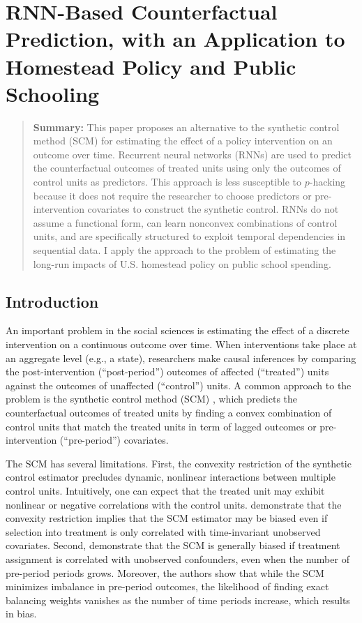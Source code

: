 \chapter[RNN-Based Counterfactual Prediction, with an Application to Homestead Policy and Public Schooling]{RNN-Based Counterfactual Prediction, with an Application to Homestead Policy and Public Schooling}\label{rnns-causal}

\begin{quote}  
	\textbf{Summary:} This paper proposes an alternative to the synthetic control method (SCM) for estimating the effect of a policy intervention on an outcome over time. Recurrent neural networks (RNNs) are used to predict the counterfactual outcomes of treated units using only the outcomes of control units as predictors. This approach is less susceptible to $p$-hacking because it does not require the researcher to choose predictors or pre-intervention covariates to construct the synthetic control. RNNs do not assume a functional form, can learn nonconvex combinations of control units, and are specifically structured to exploit temporal dependencies in sequential data. I apply the approach to the problem of estimating the long-run impacts of U.S. homestead policy on public school spending.
\end{quote}

\section{Introduction} 
\noindent

An important problem in the social sciences is estimating the effect of a discrete intervention on a continuous outcome over time. When interventions take place at an aggregate level (e.g., a state), researchers make causal inferences by comparing the post-intervention (``post-period'') outcomes of affected (``treated'') units against the outcomes of unaffected  (``control'') units. A common approach to the problem is the synthetic control method (SCM) \citep{abadie2010synthetic}, which predicts the counterfactual outcomes of treated units by finding a convex combination of control units that match the treated units in term of lagged outcomes or pre-intervention (``pre-period'') covariates. 

The SCM has several limitations. First, the convexity restriction of the synthetic control estimator precludes dynamic, nonlinear interactions between multiple control units. Intuitively, one can expect that the treated unit may exhibit nonlinear or negative correlations with the control units. \citet{ferman2016revisiting} demonstrate that the convexity restriction implies that the SCM estimator may be biased even if selection into treatment is only correlated with time-invariant unobserved covariates. Second, \citet{ferman2018synthetic} demonstrate that the SCM is generally biased if treatment assignment is correlated with unobserved confounders, even when the number of pre-period periods grows. Moreover, the authors show that while the SCM minimizes imbalance in pre-period outcomes, the likelihood of finding exact balancing weights vanishes as the number of time periods increase, which results in bias. 


